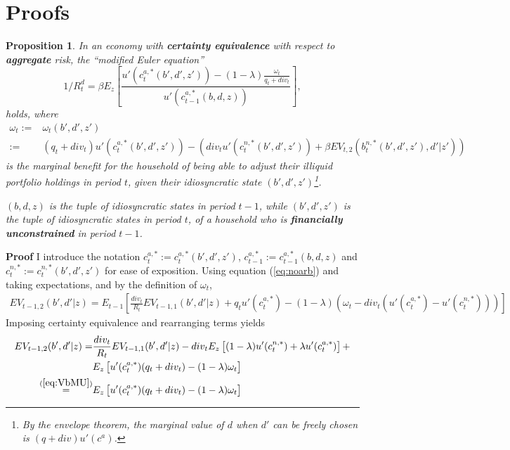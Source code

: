 \documentclass[11pt]{article} %
\newtheorem{prop}{Proposition}
\begin{document}
\section{Proofs}
\begin{prop}\label{prop:Euler}
In an economy with \textbf{certainty equivalence} with respect to \textbf{aggregate} risk, the ``modified Euler equation''
\begin{equation}
1/R_t^d = \beta E_z \left[ \frac{ u'(c_t^{a,*}(b',d',z'))  - (1-\lambda)\frac{\omega_t}{q_t+div_t}}{u'(c_{t-1}^{a,*}(b,d,z))}\right],\label{eq:modEuler}
\end{equation}
holds, where
\begin{align}
\omega_t := &\omega_t(b',d',z') \nonumber \\:= & (q_t+div_t) u'(c_t^{a,*}(b',d',z'))-(div_t u'(c_t^{n,*}(b',d',z')) +\beta EV_{t,2}(b_t^{n,*}(b',d',z'),d'|z')) \label{eq:wedge}
\end{align}
is the marginal benefit for the household of being able to adjust their illiquid portfolio holdings in period $t$, given their idiosyncratic state $(b',d',z')$\footnote{By the envelope theorem, the marginal value of $d$ when $d'$ can be freely chosen is $(q+div)u'(c^a)$.}.

$(b,d,z)$ is the tuple of idiosyncratic states in period $t-1$, while $(b',d',z')$ is the tuple of idiosyncratic states in period $t$, of a household who is \textbf{financially unconstrained} in period $t-1$.
\end{prop}
\textbf{Proof} I introduce the notation $c_t^{a,*}:=c_t^{a,*}(b',d',z')$, $c_{t-1}^{a,*}:=c_{t-1}^{a,*}(b,d,z)$ and $c_t^{n,*}:=c_t^{n,*}(b',d',z')$ for ease of exposition. Using equation (\ref{eq:noarb}) and taking expectations, and by the definition of $\omega_t$,
\begin{align}
EV_{t-1,2}(b',d'|z) = E_{t-1}\left[ \frac{div_t}{R_t} EV_{t-1,1}(b',d'|z) + q_tu'(c_t^{a,*}) - (1-\lambda)(\omega_t - div_t (u'(c_t^{a,*})-u'(c_t^{n,*})))\right]
\end{align}
Imposing certainty equivalence and rearranging terms yields
\begin{align}
EV_{t-1,2}(b',d'|z) = &\frac{div_t}{R_t} EV_{t-1,1}(b',d'|z) -  div_t E_z\left[(1-\lambda)u'(c_t^{n,*})+\lambda u'(c_t^{a,*}) \right] +\\ & E_z\left[ u'(c_t^{a,*})(q_t + div_t) - (1-\lambda)\omega_t\right]\\
\overset{(\ref{eq:VbMU})}{=} &  E_z\left[ u'(c_t^{a,*})(q_t + div_t) - (1-\lambda)\omega_t\right]
\end{align}
\end{document}
